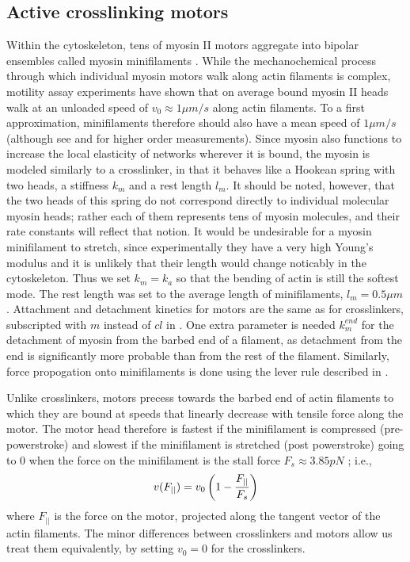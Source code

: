 \documentclass[12pt]{article}
\begin{document}
\subsection{Active crosslinking motors}
Within the cytoskeleton, tens of myosin II motors aggregate into bipolar ensembles called myosin minifilaments
\cite{stam2015}. While the mechanochemical process through which individual myosin motors walk along actin filaments is complex, 
motility assay experiments have shown that on average bound myosin II heads walk at an unloaded speed of $v_0\approx1\mu m/s$ along actin
filaments\cite{finer1994}. To a first approximation, minifilaments therefore should also 
have a mean speed of $1\mu m/s$ (although see \cite{stam2015} and \cite{walcott2012} for higher order measurements). 
Since myosin also functions to increase the local elasticity of networks wherever it is bound, the myosin is modeled
similarly to a crosslinker, in that it behaves like a Hookean spring with two heads, a stiffness $k_{m}$ and a rest
length $l_m$. It should be noted, however, that the two heads of this spring do not correspond directly to individual
molecular myosin heads; rather each of them represents tens of myosin molecules, and their rate constants will reflect
that notion. 
It would be undesirable for a myosin minifilament to stretch, 
since experimentally they have a very high
Young's modulus and it is unlikely that their length would change noticably in the cytoskeleton. 
Thus we set $k_m=k_a$ so that the bending of actin is still the softest mode. 
The rest length was set to the average length of minifilaments, $l_m=0.5\mu m$\cite{niederman1975}.
Attachment and detachment kinetics for motors are the same as for crosslinkers, subscripted with $m$
instead of $cl$ in . One extra parameter is needed $k_m^{end}$ for the
detachment of myosin from the barbed end of a filament, as detachment from the end is significantly more probable than
from the rest of the filament.
Similarly, force propogation onto minifilaments is done using the lever rule described in .
\par
Unlike crosslinkers, motors precess towards the barbed end of actin filaments to which they are bound 
at speeds that linearly decrease with tensile force along the motor. 
The motor head therefore is fastest if the minifilament is
compressed (pre-powerstroke) and slowest if the minifilament is stretched (post powerstroke) 
going to $0$ when the force on the minifilament is the stall force $F_s\approx 3.85pN$ \cite{nedelec2002, gordon2012}; i.e.,  
\begin{equation} 
  v(F_{||}) = v_0\left( 1-{F_{||}\over F_s} \right)
    \label{eqn:myo_vel}
\end{equation} 
where $F_{||}$ is the force on the motor, projected along the tangent vector of the
actin filaments.
The minor differences between crosslinkers and motors allow us treat them equivalently, by 
setting $v_0 = 0$ for the crosslinkers.  
\end{document}
